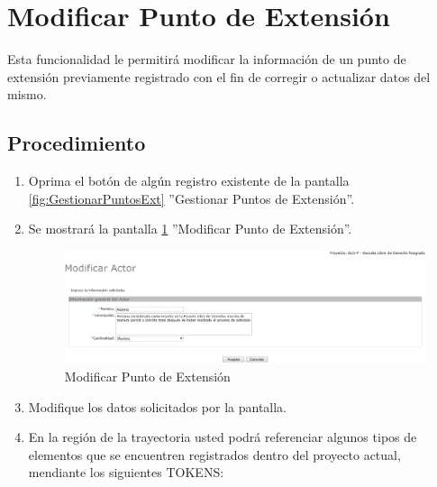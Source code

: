 \hypertarget{cv:modificarPExt}{\section{Modificar Punto de Extensión}} \label{sec:modificarPExt}

	Esta funcionalidad le permitirá modificar la información de un punto de extensión previamente registrado con el fin de corregir o actualizar datos del mismo. 

		\subsection{Procedimiento}

			\begin{enumerate}
	
			\item Oprima el botón \IUEditar{} de algún registro existente de la pantalla \ref{fig:GestionarPuntosExt} ''Gestionar Puntos de Extensión''.
	
			\item Se mostrará la pantalla \ref{fig:modificarPExt} ''Modificar Punto de Extensión''.
			
			\begin{figure}[htbp!]
				\begin{center}
					\includegraphics[scale=0.5]{roles/lider/actor/pantallas/IU10-2modificarActor}
					\caption{Modificar Punto de Extensión}
					\label{fig:modificarPExt}
				\end{center}
			\end{figure}
		
			\item Modifique los datos solicitados por la pantalla.
			
			\item En la región de la trayectoria usted podrá referenciar algunos tipos de elementos que se encuentren registrados dentro del proyecto actual, mendiante los siguientes TOKENS:
			

\end{enumerate}
